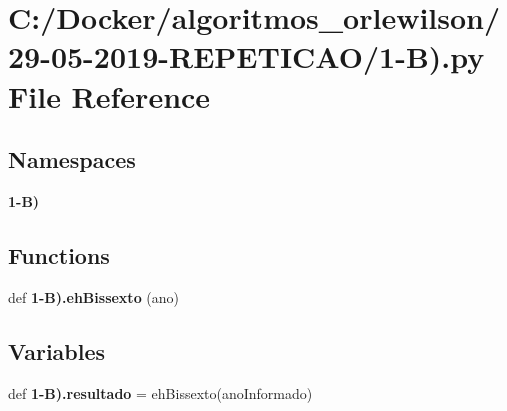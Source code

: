 \section{C\+:/\+Docker/algoritmos\+\_\+orlewilson/29-\/05-\/2019-\/\+R\+E\+P\+E\+T\+I\+C\+A\+O/1-\/B).py File Reference}
\label{1-_b_08_8py}
\subsection*{Namespaces}
\begin{DoxyCompactItemize}
\item 
 \textbf{ 1-\/\+B)}
\end{DoxyCompactItemize}
\subsection*{Functions}
\begin{DoxyCompactItemize}
\item 
def \textbf{ 1-\/\+B).\+eh\+Bissexto} (ano)
\end{DoxyCompactItemize}
\subsection*{Variables}
\begin{DoxyCompactItemize}
\item 
def \textbf{ 1-\/\+B).\+resultado} = eh\+Bissexto(ano\+Informado)
\end{DoxyCompactItemize}
